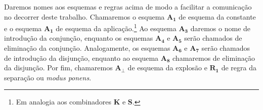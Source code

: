     Daremos nomes aos esquemas e regras acima de modo a facilitar a comunicação no decorrer deste trabalho. Chamaremos o esquema $\mathbf{A_1}$ de esquema da constante e o esquema $\mathbf{A_1}$ de esquema da aplicação.\footnote{Em analogia aos combinadores $\mathbf{K}$ e $\mathbf{S}$.} Ao esquema $\mathbf{A_3}$ daremos o nome de introdução da conjunção, enquanto os esquemas $\mathbf{A_4}$ e $\mathbf{A_5}$ serão chamados de eliminação da conjunção. Analogamente, os esquemas $\mathbf{A_6}$ e $\mathbf{A_7}$ serão chamados de introdução da disjunção, enquanto ao esquema $\mathbf{A_8}$ chamaremos de eliminação da disjunção.
    Por fim, chamaremos $\mathbf{A_\bot}$ de esquema da explosão e $\mathbf{R_1}$ de regra da separação ou \emph{modus ponens}.
